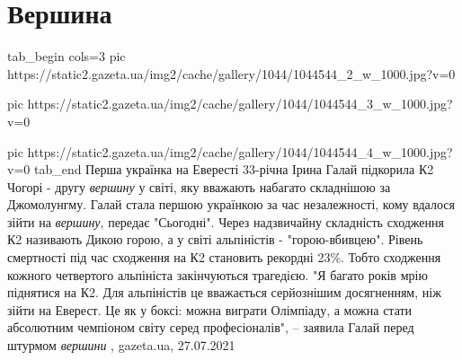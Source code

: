  
 
 
 
 
\chapter{Вершина}
\label{sec:slova.vershina}

\ifcmt
  tab_begin cols=3
     pic https://static2.gazeta.ua/img2/cache/gallery/1044/1044544_2_w_1000.jpg?v=0

     pic https://static2.gazeta.ua/img2/cache/gallery/1044/1044544_3_w_1000.jpg?v=0
		 
		 pic https://static2.gazeta.ua/img2/cache/gallery/1044/1044544_4_w_1000.jpg?v=0
  tab_end
\fi
Перша українка на Евересті 33-річна Ірина Галай підкорила К2 Чогорі - другу
\emph{вершину} у світі, яку вважають набагато складнішою за Джомолунгму.
Галай стала першою українкою за час незалежності, кому вдалося зійти на
\emph{вершину}, передає "Сьогодні". Через надзвичайну складність сходження К2
називають Дикою горою, а у світі альпіністів - "горою-вбивцею". Рівень
смертності під час сходження на К2 становить рекордні 23\%. Тобто сходження
кожного четвертого альпініста закінчуються трагедією.
"Я багато років мрію піднятися на К2. Для альпіністів це вважається серйознішим
досягненням, ніж зійти на Еверест. Це як у боксі: можна виграти Олімпіаду, а
можна стати абсолютним чемпіоном світу серед професіоналів", – заявила Галай
перед штурмом \emph{вершини}
, 
gazeta.ua, 27.07.2021
